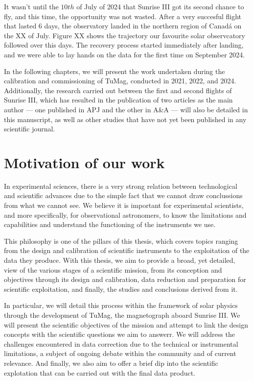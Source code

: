 It wasn't until the $10th$ of July of 2024 that Sunrise III got its second chance to fly, and this time, the opportunity was not wasted. After a very succesful flight that lasted 6 days, the observatory landed in the northern region of Canadá on the XX of July. Figure XX shows the trajectory our favourite solar observcatory followed over this days. The recovery process started immediately after landing, and we were able to lay hands on the data for the first time on September 2024. 

In the following chapters, we will present the work undertaken during the calibration and commissioning of TuMag, conducted in 2021, 2022, and 2024. Additionally, the research carried out between the first and second flights of Sunrise III, which has resulted in the publication of two articles as the main author — one published in APJ and the other in A\&A — will also be detailed in this manuscript, as well as other studies that have not yet been published in any scientific journal. 


\section{Motivation of our work}

In experimental sciences, there is a very strong relation between technological and scientific advances due to the simple fact that we cannot draw conclussions from what we cannot see. We believe it is important for experimental scientists, and more specifically, for observational astronomers, to know the limitations and capabilities and understand the functioning of the instruments we use. 

This philosophy is one of the pillars of this thesis, which covers topics ranging from the design and calibration of scientific instruments to the exploitation of the data they produce. With this thesis, we aim to provide a broad, yet detailed, view of the various stages of a scientific mission, from its conception and objectives through its design and calibration, data reduction and preparation for scientific exploitation, and finally, the studies and conclusions derived from it.

In particular, we will detail this process within the framework of solar physics through the development of TuMag, the magnetograph aboard Sunrise III. We will present the scientific objectives of the mission and attempt to link the design concepts with the scientific questions we aim to answerr. We will address the challenges encountered in data correction due to the technical or instrumental limitations, a subject of ongoing debate within the community and of current relevance. And finally, we also aim to offer a brief dip into the scientific explotation that can be carried out with the final data product. 

